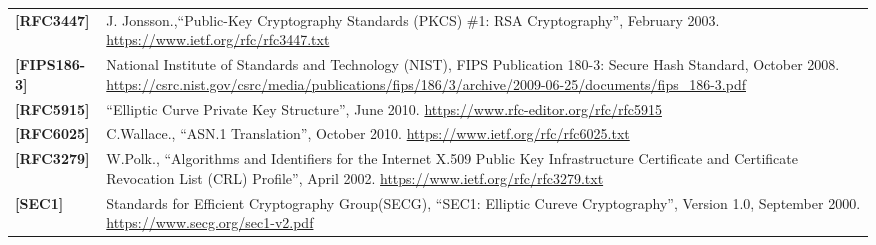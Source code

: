 \begin{longtable}{l p{5in}}
	\label{intro:rfc3447}\textbf{[RFC3447]} &
    J. Jonsson.,``Public-Key Cryptography Standards (PKCS) \#1: RSA Cryptography'', February 2003.
	\newline\url{https://www.ietf.org/rfc/rfc3447.txt}\\
	\label{intro:NIST}\textbf{[FIPS186-3]} &
     National Institute of Standards and Technology (NIST), FIPS Publication 180-3: Secure Hash Standard, October 2008.
	\newline\url{https://csrc.nist.gov/csrc/media/publications/fips/186/3/archive/2009-06-25/documents/fips_186-3.pdf}\\
	\label{intro:rfc5915}\textbf{[RFC5915]} &
    ``Elliptic Curve Private Key Structure'', June 2010.
	\newline\url{https://www.rfc-editor.org/rfc/rfc5915}\\
	\label{intro:rfc6025}\textbf{[RFC6025]} &
    C.Wallace., ``ASN.1 Translation'', October 2010.
	\newline\url{https://www.ietf.org/rfc/rfc6025.txt}\\
	\label{intro:rfc3279}\textbf{[RFC3279]} &
    W.Polk., ``Algorithms and Identifiers for the Internet X.509 Public Key Infrastructure Certificate and Certificate Revocation List (CRL) Profile'', April 2002.
	\newline\url{https://www.ietf.org/rfc/rfc3279.txt}\\
	\label{intro:SEC1}\textbf{[SEC1]} &
    Standards for Efficient Cryptography Group(SECG), ``SEC1: Elliptic Cureve Cryptography'', Version 1.0, September 2000.
	\newline\url{https://www.secg.org/sec1-v2.pdf}\\


\end{longtable}
